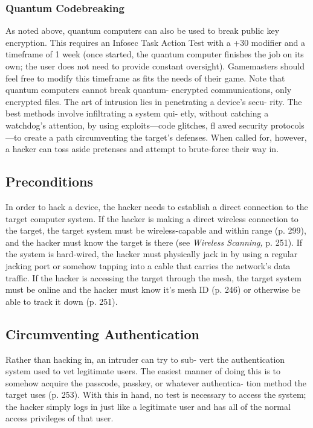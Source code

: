 \subsubsection{Quantum Codebreaking}

As noted above, quantum computers can also be used 
to break public key encryption. This requires an Infosec 
Task Action Test with a +30 modifier and a timeframe 
of 1 week (once started, the quantum computer finishes 
the job on its own; the user does not need to provide 
constant oversight). Gamemasters should feel free to 
modify this timeframe as fits the needs of their game. 
Note that quantum computers cannot break quantum-
encrypted communications, only encrypted files.
The art of intrusion lies in penetrating a device's secu-
rity. The best methods involve infiltrating a system qui-
etly, without catching a watchdog's attention, by using 
exploits—code glitches, fl awed security protocols—to 
create a path circumventing the target's defenses. When 
called for, however, a hacker can toss aside pretenses 
and attempt to brute-force their way in.

\subsection{Preconditions}

In order to hack a device, the hacker needs to establish 
a direct connection to the target computer system. If 
the hacker is making a direct wireless connection to 
the target, the target system must be wireless-capable 
and within range (p. 299), and the hacker must know 
the target is there (see \textit{Wireless Scanning,} p. 251). If 
the system is hard-wired, the hacker must physically 
jack in by using a regular jacking port or somehow 
tapping into a cable that carries the network's data 
traffic. If the hacker is accessing the target through the 
mesh, the target system must be online and the hacker 
must know it's mesh ID (p. 246) or otherwise be able 
to track it down (p. 251).

\subsection{Circumventing Authentication}

Rather than hacking in, an intruder can try to sub-
vert the authentication system used to vet legitimate 
users. The easiest manner of doing this is to somehow 
acquire the passcode, passkey, or whatever authentica-
tion method the target uses (p. 253). With this in hand, 
no test is necessary to access the system; the hacker 
simply logs in just like a legitimate user and has all of 
the normal access privileges of that user.

